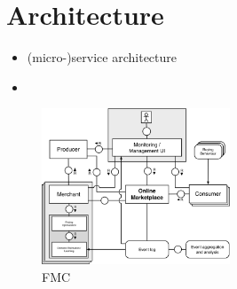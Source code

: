 \section{Architecture}
\label{sec:Architecture}

\begin{itemize}
\item (micro-)service architecture
\item  
\end{itemize}


%
\begin{figure}[h]
    \centering
    \includegraphics[width=0.5\textwidth]{images/fmc.png}
    \caption{FMC}
    \label{fig:fmc}
\end{figure}
%